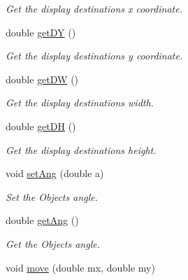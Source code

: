 \begin{DoxyCompactItemize}
\begin{DoxyCompactList}\small\item\em Get the display destinations x coordinate. \end{DoxyCompactList}\item 
double \hyperlink{classObject_a6b011de1c1529d64b2cf3828f0450180}{get\+DY} ()\hypertarget{classObject_a6b011de1c1529d64b2cf3828f0450180}{}\label{classObject_a6b011de1c1529d64b2cf3828f0450180}

\begin{DoxyCompactList}\small\item\em Get the display destinations y coordinate. \end{DoxyCompactList}\item 
double \hyperlink{classObject_aa02be608cc4043a38675b93d69f5b42f}{get\+DW} ()\hypertarget{classObject_aa02be608cc4043a38675b93d69f5b42f}{}\label{classObject_aa02be608cc4043a38675b93d69f5b42f}

\begin{DoxyCompactList}\small\item\em Get the display destinations width. \end{DoxyCompactList}\item 
double \hyperlink{classObject_a9bb26c1b30e1a77a6ae4de340c4ab2f4}{get\+DH} ()\hypertarget{classObject_a9bb26c1b30e1a77a6ae4de340c4ab2f4}{}\label{classObject_a9bb26c1b30e1a77a6ae4de340c4ab2f4}

\begin{DoxyCompactList}\small\item\em Get the display destinations height. \end{DoxyCompactList}\item 
void \hyperlink{classObject_a660b00ecff522cd7dfef7b0f736456e6}{set\+Ang} (double a)\hypertarget{classObject_a660b00ecff522cd7dfef7b0f736456e6}{}\label{classObject_a660b00ecff522cd7dfef7b0f736456e6}

\begin{DoxyCompactList}\small\item\em Set the Objects angle. \end{DoxyCompactList}\item 
double \hyperlink{classObject_a9d6545d0250767ddb6e9d4c6fbf41d4b}{get\+Ang} ()\hypertarget{classObject_a9d6545d0250767ddb6e9d4c6fbf41d4b}{}\label{classObject_a9d6545d0250767ddb6e9d4c6fbf41d4b}

\begin{DoxyCompactList}\small\item\em Get the Objects angle. \end{DoxyCompactList}\item 
void \hyperlink{classObject_a31ef66bafcc755414112789c9231a8be}{move} (double mx, double my)\hypertarget{classObject_a31ef66bafcc755414112789c9231a8be}{}\label{classObject_a31ef66bafcc755414112789c9231a8be}


\end{DoxyCompactItemize}
